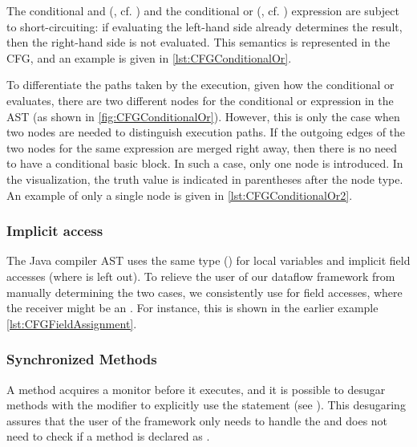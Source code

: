 The conditional and (\code{&&}, cf. ) and the conditional
or (\code{||}, cf. ) expression are subject to short-circuiting:
if evaluating the left-hand side already determines the result, then the right-hand
side is not evaluated. This semantics is represented in the CFG, and an example
is given in \autoref{lst:CFGConditionalOr}.

To differentiate the paths taken by the execution, given how the conditional or evaluates,
there are two different nodes for the conditional or expression in the AST
(as shown in \autoref{fig:CFGConditionalOr}). However, this is only the case when
two nodes are needed to distinguish execution paths. If the outgoing edges
of the two nodes for the same expression are merged right away, then there is
no need to have a conditional basic block. In such a case, only one
node is introduced. In the visualization, the truth value is indicated in
parentheses after the node type. An example of only a single node is given in
\autoref{lst:CFGConditionalOr2}.




\subsubsection{Implicit  access}

The Java compiler AST uses the same type () for local variables
and implicit field accesses (where  is left out).
To relieve the user of our dataflow framework from manually determining
the two cases, we consistently use  for field accesses,
where the receiver might be an .
For instance, this is shown in the earlier example \autoref{lst:CFGFieldAssignment}.


\subsubsection{Synchronized Methods}

A  method acquires a monitor before it executes, and it is possible
to desugar methods with the  modifier to explicitly use
the  statement (see ). This desugaring
assures that the user of the framework only needs to handle the
 and does not need to check if a method is declared as
.


